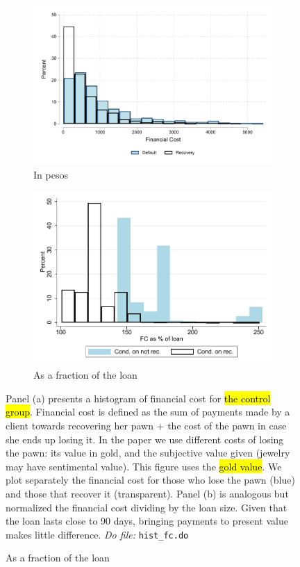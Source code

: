\documentclass[11pt]{article}
\begin{document}
\begin{figure}[H]
     \caption{Financial cost}
    \label{fc_hist}
    \begin{center}
    \begin{subfigure}{.45\textwidth}
      \caption{In pesos}
        \centering
        \includegraphics[width=\textwidth]{Figuras/hist_fc.pdf}
    \end{subfigure}
    \begin{subfigure}{0.45\textwidth}
    \caption{As a fraction of the loan}
       \centering
      \includegraphics[width=\textwidth]{Figuras/hist_fc_perc_loan.pdf}
    \end{subfigure}
    \end{center}
         \scriptsize
         Panel (a) presents a histogram of financial cost for \hl{the control group}. Financial cost is defined as the sum of payments made by a client towards recovering her pawn + the cost of the pawn in case she ends up losing it. In the paper we use different costs of losing the pawn: its value in gold, and the subjective value given (jewelry may have sentimental value). This figure uses the \hl{gold value}. We plot separately the financial cost for those who lose the pawn (blue) and those that recover it (transparent).  Panel (b) is analogous but normalized the financial cost dividing by the loan size.  Given that the loan lasts close to 90 days, bringing payments to present value makes little difference. 
      \footnotesize{ } \textit{Do file: }  \texttt{hist\_fc.do}
\end{figure}
\end{document}
